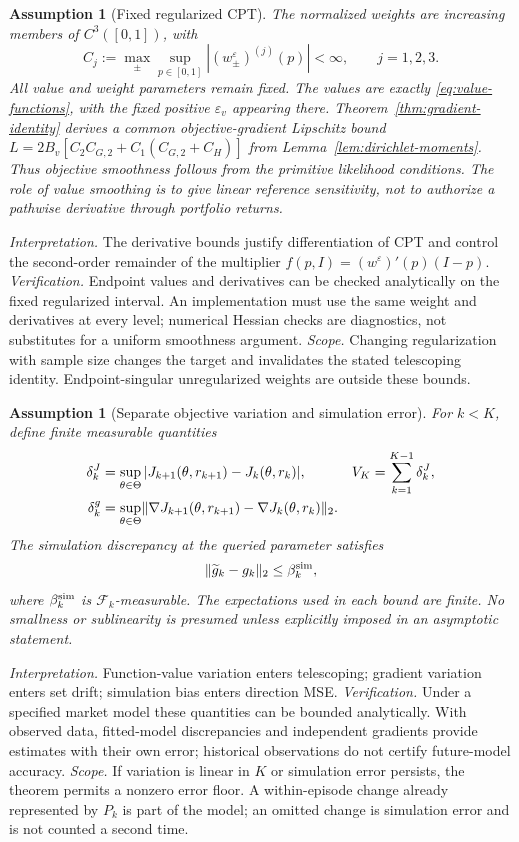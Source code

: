 \documentclass[11pt]{article}
\newtheorem{assumption}[theorem]{Assumption}
\newcommand{\1}{\mathbf 1}
\DeclarePairedDelimiter{\norm}{\lVert}{\rVert}
\newcommand{\cF}{\mathcal F}
\newcommand{\eps}{\varepsilon}
\newcommand{\assess}[3]{\par\noindent\emph{Interpretation.} #1 \emph{Verification.} #2 \emph{Scope.} #3\par}
\begin{document}
\begin{assumption}[Fixed regularized CPT]\label{ass:smooth-cpt}
The normalized weights are increasing members of $C^3([0,1])$, with
\[
 C_j:=\max_{\pm}\sup_{p\in[0,1]}|(w_\pm^\eps)^{(j)}(p)|<\infty,
 \qquad j=1,2,3.
\]
All value and weight parameters remain fixed. The values are exactly \eqref{eq:value-functions}, with the fixed positive $\eps_v$ appearing there. Theorem~\ref{thm:gradient-identity} derives a common objective-gradient Lipschitz bound $L=2B_v[C_2C_{G,2}+C_1(C_{G,2}+C_H)]$ from Lemma~\ref{lem:dirichlet-moments}. Thus objective smoothness follows from the primitive likelihood conditions. The role of value smoothing is to give linear reference sensitivity, not to authorize a pathwise derivative through portfolio returns.
\end{assumption}
\assess{The derivative bounds justify differentiation of CPT and control the second-order remainder of the multiplier $f(p,I)=(w^\eps)'(p)(I-p)$.}{Endpoint values and derivatives can be checked analytically on the fixed regularized interval. An implementation must use the same weight and derivatives at every level; numerical Hessian checks are diagnostics, not substitutes for a uniform smoothness argument.}{Changing regularization with sample size changes the target and invalidates the stated telescoping identity. Endpoint-singular unregularized weights are outside these bounds.}

\begin{assumption}[Separate objective variation and simulation error]\label{ass:drift}
For $k<K$, define finite measurable quantities
\begin{align}
 \delta_k^{J}&=\sup_{\theta\in\Theta}|J_{k+1}(\theta,r_{k+1})-J_k(\theta,r_{k})|,
 &V_K&=\sum_{k=1}^{K-1}\delta_k^{J},\label{eq:value-drift}\\
 \delta_k^{g}&=\sup_{\theta\in\Theta}
 \norm{\nabla J_{k+1}(\theta,r_{k+1})-\nabla J_k(\theta,r_{k})}_2.&&\label{eq:gradient-drift}
\end{align}
The simulation discrepancy at the queried parameter satisfies
\begin{equation}\label{eq:simulation-bias}
 \norm{\widetilde g_k-g_k}_2\le\beta_k^{\rm sim},
\end{equation}
where $\beta_k^{\rm sim}$ is $\cF_k$-measurable. The expectations used in each bound are finite. No smallness or sublinearity is presumed unless explicitly imposed in an asymptotic statement.
\end{assumption}
\assess{Function-value variation enters telescoping; gradient variation enters set drift; simulation bias enters direction MSE.}{Under a specified market model these quantities can be bounded analytically. With observed data, fitted-model discrepancies and independent gradients provide estimates with their own error; historical observations do not certify future-model accuracy.}{If variation is linear in $K$ or simulation error persists, the theorem permits a nonzero error floor. A within-episode change already represented by $P_k$ is part of the model; an omitted change is simulation error and is not counted a second time.}
\end{document}
